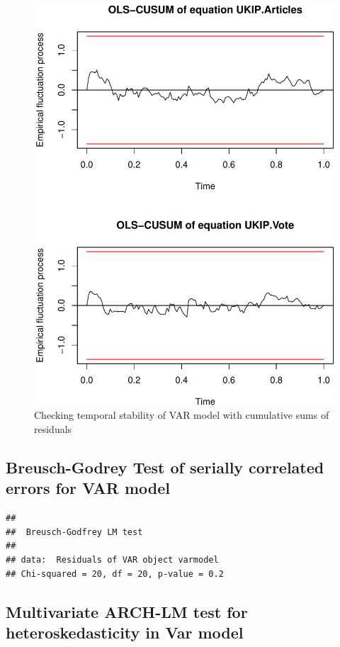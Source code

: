 \documentclass[11pt, oneside]{article}   	%
\begin{document}
\begin{figure}[htbp]
\centering
\includegraphics{ukip_media_files/figure-latex/stability-check-vote-1.pdf}
\caption{Checking temporal stability of VAR model with cumulative sums
of residuals}
\end{figure}

\newpage

\subsection*{Breusch-Godrey Test of serially correlated errors for VAR
model}\label{breusch-godrey-test-of-serially-correlated-errors-for-var-model}

\begin{verbatim}
## 
##  Breusch-Godfrey LM test
## 
## data:  Residuals of VAR object varmodel
## Chi-squared = 20, df = 20, p-value = 0.2
\end{verbatim}

\subsection*{Multivariate ARCH-LM test for heteroskedasticity in Var
model}\label{multivariate-arch-lm-test-for-heteroskedasticity-in-var-model}
\end{document}
